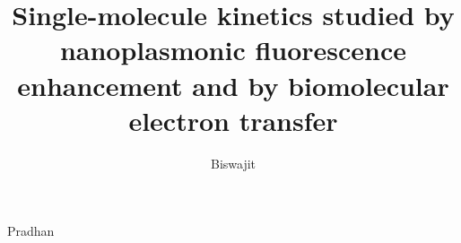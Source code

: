 \documentclass[print]{dissertation}%
\begin{document}
\title[]{Single-molecule kinetics studied by nanoplasmonic fluorescence enhancement and by biomolecular electron transfer}
\author{Biswajit}{Pradhan}

\frontmatter


% 
% 
% 
% 
% 
% 
% 
% 
% 
% 

\end{document}
